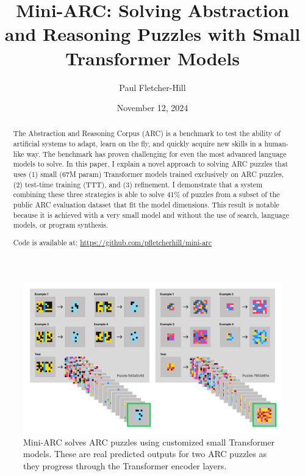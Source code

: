 \documentclass[10pt,twocolumn]{article}
\begin{document}
\title{Mini-ARC: Solving Abstraction and Reasoning Puzzles with Small
Transformer Models}

\author{Paul Fletcher-Hill}
\date{November 12, 2024}

\maketitle

\begin{figure}[h!]
  \centering
  \includegraphics[width=\textwidth]{figures/header.png}
  \caption{Mini-ARC solves ARC puzzles using customized small
    Transformer models. These are real predicted outputs for two ARC
  puzzles as they progress through the Transformer encoder layers.}
  \label{fig:top-image}
\end{figure}

\begin{abstract}
  The Abstraction and Reasoning Corpus (ARC)\cite{arc} is a benchmark
  to test the ability of artificial systems to adapt, learn on the
  fly, and quickly acquire new skills in a human-like way. The
  benchmark has proven challenging for even the most advanced
  language models to solve. In this paper, I explain a novel approach
  to solving ARC puzzles that uses (1) small (67M param) Transformer models
  trained exclusively on ARC puzzles, (2) test-time training (TTT),
  and (3) refinement. I demonstrate that a system combining these
  three strategies is able to solve 41\% of puzzles from a subset of
  the public ARC evaluation dataset that fit the model dimensions.
  This result is notable because
  it is achieved with a very small model and without the use of
  search, language models, or program synthesis.

  Code is available at: \url{https://github.com/pfletcherhill/mini-arc}
\end{abstract}
\end{document}
